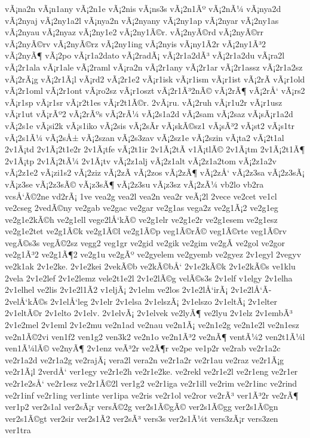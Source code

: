 {vÃ¡na2n
vÃ¡n1any
vÃ¡2n1e
vÃ¡2nis
vÃ¡ns3s
vÃ¡2n1Ãº
vÃ¡2nÃ¼
vÃ¡nya2d
vÃ¡2nyaj
vÃ¡2ny1a2l
vÃ¡nya2n
vÃ¡2nyany
vÃ¡2ny1ap
vÃ¡2nyar
vÃ¡2ny1as
vÃ¡2nyau
vÃ¡2nyaz
vÃ¡2ny1e2
vÃ¡2ny1Ã©r.
vÃ¡2nyÃ©rd
vÃ¡2nyÃ©rr
vÃ¡2nyÃ©rv
vÃ¡2nyÃ©rz
vÃ¡2ny1ing
vÃ¡2nyis
vÃ¡ny1Ã­2r
vÃ¡2ny1Ã³2
vÃ¡2nyÃ¶
vÃ¡2po
vÃ¡r1a2dato
vÃ¡2radÃ¡
vÃ¡2r1a2dÃ³
vÃ¡2r1a2du
vÃ¡ra2l
vÃ¡2r1ala
vÃ¡r1ale
vÃ¡2raml
vÃ¡ra2n
vÃ¡2r1any
vÃ¡2r1ar
vÃ¡2r1assz
vÃ¡2r1a2sz
vÃ¡2rÃ¡g
vÃ¡2r1Ã¡l
vÃ¡rd2
vÃ¡2r1e2
vÃ¡r1isk
vÃ¡r1ism
vÃ¡r1ist
vÃ¡2rÃ­
vÃ¡r1old
vÃ¡2r1oml
vÃ¡2r1ont
vÃ¡ro2sz
vÃ¡r1oszt
vÃ¡2r1Ã³2nÃ©
vÃ¡2rÃ¶
vÃ¡2rÅ‘
vÃ¡rs2
vÃ¡r1sp
vÃ¡r1sr
vÃ¡r2t1es
vÃ¡r2t1Ã©r.
2vÃ¡ru.
vÃ¡2ruh
vÃ¡r1u2r
vÃ¡r1usz
vÃ¡r1ut
vÃ¡rÃº2
vÃ¡2rÃºs
vÃ¡2rÃ¼
vÃ¡2s1a2d
vÃ¡2sam
vÃ¡2saz
vÃ¡sÃ¡r1a2d
vÃ¡2s1e
vÃ¡si2k
vÃ¡s1iko
vÃ¡2sis
vÃ¡2sÃ­r
vÃ¡skÃ©sz1
vÃ¡sÃ³2
vÃ¡st2
vÃ¡s1tr
vÃ¡2s1Ã¼
vÃ¡2sÅ±
vÃ¡2szan
vÃ¡2s3zav
vÃ¡2sz1e
vÃ¡2szin
vÃ¡ta2
vÃ¡2t1al
2v1Ã¡td
2v1Ã¡2t1e2r
2v1Ã¡tfe
vÃ¡2t1ir
2v1Ã¡2tÃ­
v1Ã¡tlÃ©
2v1Ã¡tm
2v1Ã¡2t1Ã¶
2v1Ã¡tp
2v1Ã¡2tÃ¼
2v1Ã¡tv
vÃ¡2z1alj
vÃ¡2z1alt
vÃ¡2z1a2tom
vÃ¡2z1a2v
vÃ¡2z1e2
vÃ¡zi1s2
vÃ¡2ziz
vÃ¡2zÃ­
vÃ¡2zos
vÃ¡2zÃ¶
vÃ¡2zÅ‘
vÃ¡2z3sa
vÃ¡2z3sÃ¡
vÃ¡z3se
vÃ¡2z3sÃ©
vÃ¡z3sÃ¶
vÃ¡2z3su
vÃ¡z3sz
vÃ¡2zÃ¼
vb2lo
vb2ra
vcsÅ‘Ã©2ne
vd2rÃ¡
1ve
vea2g
vea2l
vea2n
vea2r
veÃ¡2l
2vece
ve2cet
ve1cl
ve2cseg
2vedÃ©ny
ve2gab
ve2gac
ve2gar
ve2g1as
vega2z
ve2g1Ã¡2
ve2g1eg
ve2g1e2kÃ©h
ve2g1ell
vege2lÅ‘kÃ©
ve2g1elr
ve2g1e2r
ve2g1esem
ve2g1esz
ve2g1e2tet
ve2g1Ã©k
ve2g1Ã©l
ve2g1Ã©p
veg1Ã©rÃ©
veg1Ã©rte
veg1Ã©rv
vegÃ©s3s
vegÃ©2sz
vegg2
veg1gr
ve2gid
ve2gik
ve2gim
ve2gÃ­
ve2gol
ve2gor
ve2g1Ã³2
ve2g1Ã¶2
ve2g1u
ve2gÃº
ve2gyelem
ve2gyemb
ve2gyez
2v1egyl
2vegyv
ve2k1ak
2v1e2ke.
2v1e2kei
2vekÃ©b
ve2kÃ©bÅ‘
2v1e2kÃ©k
2v1e2kÃ©s
ve1klu
2vela
2v1e2lef
2v1e2lemz
vele2t1e2l
2v1e2lÃ©g
velÃ©s3s
2v1elf
v1elgy
2v1elha
2v1elhel
ve2lis
2v1e2l1Ã­2
v1eljÃ¡
2v1elm
ve2los
2v1e2lÅ‘irÃ¡
2v1e2lÅ‘Ã­
2velÅ‘kÃ©s
2v1elÅ‘leg
2v1elr
2v1elsa
2v1elszÃ¡
2v1elszo
2v1eltÃ¡
2v1elter
2v1eltÃ©r
2v1elto
2v1elv.
2v1elvÃ¡
2v1elvek
ve2lyÃ¶
ve2lyu
2v1elz
2v1embÃ³
2v1e2mel
2v1eml
2v1e2mu
ve2n1ad
ve2nau
ve2n1Ã¡
ve2n1e2g
ve2n1e2l
ve2n1esz
ve2n1Ã©2vi
ven1f2
ven1g2
ven3k2
ve2n1o
ve2n1Ã³2
ve2nÃ¶
ventÃ¼2
ven2t1Ã¼l
ven1Ã¼lÃ©
ve2nyÃ¶
2v1enz
veÃ³2r
ve2Ã¶r
ve2pe
ve1p2r
ve2rab
ve2r1a2c
ve2r1a2d
ve2r1a2g
ve2rajÃ¡
vera2l
vera2n
ve2r1a2r
ve2r1au
ve2raz
ve2r1Ã¡g
ve2r1Ã¡l
2verdÅ‘
ver1egy
ve2r1e2h
ve2r1e2ke.
ve2rekl
ve2r1e2l
ve2r1eng
ve2r1er
ve2r1e2sÅ‘
ve2r1esz
ve2r1Ã©2l
ver1g2
ve2r1iga
ve2r1ill
ve2rim
ve2r1inc
ve2rind
ve2r1inf
ve2r1ing
ver1inte
ver1ipa
ve2ris
ve2r1ol
ve2ror
ve2rÃ³
ver1Ã³2r
ve2rÃ¶
ver1p2
ver2s1al
ver2sÃ¡r
versÃ©2g
ver2s1Ã©gÃ©
ver2s1Ã©gg
ver2s1Ã©gn
ver2s1Ã©gt
ver2sir
ver2s1Ã­2
ver2sÃ³
vers3s
ver2s1Ã¼t
vers3zÃ¡r
vers3zen
ver1tra
}
